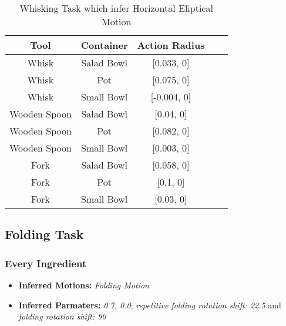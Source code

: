   \begin{table}[H]
      \centering
      \begin{tabular}{|c|c|c|c|c|}
      \hline
      \textbf{Tool} & \textbf{Container} & \textbf{Action Radius}\\
      \hline
      Whisk & Salad Bowl & [0.033, 0] \\
      \hline
      Whisk & Pot & [0.075, 0] \\
      \hline
      Whisk & Small Bowl & [-0.004, 0]\\
      \hline
      Wooden Spoon & Salad Bowl & [0.04, 0] \\
      \hline
      Wooden Spoon & Pot & [0.082, 0] \\
      \hline
      Wooden Spoon & Small Bowl & [0.003, 0] \\
      \hline
      Fork & Salad Bowl & [0.058, 0] \\
      \hline
      Fork & Pot & [0.1, 0] \\
      \hline
      Fork & Small Bowl & [0.03, 0] \\
      \hline
  \end{tabular}
  \caption{Whisking Task which infer Horizontal Eliptical Motion}
  
  \end{table}

\subsection{Folding Task}
\subsubsection{Every Ingredient}

\begin{itemize}
    \item \textbf{Inferred Motions:} \textit{Folding Motion}
    \item \textbf{Inferred Parmaters:} \textit{0.7, 0.0}; \textit{repetitive folding rotation shift: 22.5} and \textit{folding rotation shift: 90}
\end{itemize}
  
